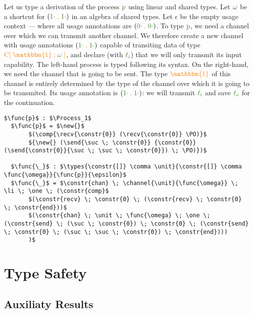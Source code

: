 \documentclass[a4paper,UKenglish,cleveref,autoref,thm-restate,authorcolumns]{lipics-v2019}
\theoremstyle{definition}
\newcommand{\type}[1]{\textcolor{BlueViolet}{\operatorname{#1}}}
\newcommand{\constr}[1]{\textcolor{BurntOrange}{\operatorname{#1}}}
\newcommand{\func}[1]{\textcolor{OliveGreen}{\operatorname{#1}}}
\newcommand{\PO}{\constr{\mathbb{0}}}
\newcommand{\comp}[2]{#1 \; \constr{\parallel} \; #2}
\newcommand{\new}{\constr{\boldsymbol{\nu}} \;}
\newcommand{\send}[2]{#1 \; \constr{\langle} \; #2 \;\constr{\rangle} \;}
\newcommand{\recv}[1]{#1 \; \constr{\mathbb{()}} \;}
\newcommand{\suc}{\constr{\scriptstyle 1+}}
\newcommand{\unit}{\constr{\mathbbm{1}}}
\newcommand{\channel}[2]{\constr{C[} \; #1 \; \constr{;} \; #2 \; \constr{]}}
\newcommand{\comma}{\; \constr{,} \;}
\newcommand{\zero}{\func{0\cdot}}
\newcommand{\one}{\func{1\cdot}}
\newcommand{\li}{\func{\ell_i}}
\newcommand{\lo}{\func{\ell_o}}
\newcommand{\types}[4]{#1 \; \type{;} \; #2 \; \type{\vdash} \; #3 \; \type{\triangleright} \; #4}
\newcommand{\Process}{\type{PROCESS}}
\begin{document}
\begin{example}
  \label{example-derivations}
  Let us type a derivation of the process $\func{p}$ using linear and shared types. 
  Let $\func{\omega}$ be a shortcut for $(\one \comma \one)$ in an algebra of shared types.
  Let $\epsilon$ be the empty usage context --- where all usage annotations are $(\zero \comma \zero)$.
  To type $\func{p}$, we need a channel over which we can transmit another channel.
  We therefore create a new channel with usage annotations $(\one \comma \one)$ capable of transiting data of type $\channel{\unit}{\func{\omega}}$, and declare (with $\li$) that we will only transmit its input capability.
  The left-hand process is typed following its syntax.
  On the right-hand, we need the channel that is going to be sent.
  The type $\unit$ of this channel is entirely determined by the type of the channel over which it is going to be transmited.
  Its usage annotation is $(\one \comma \one)$: we will transmit $\li$ and save $\lo$ for the continuation.
  
  \begin{lstlisting}[mathescape]
  $\func{p}$ : $\Process_1$
  $\func{p}$ = $\new{}$
       $(\comp{\recv{\constr{0}} (\recv{\constr{0}} \PO)}$
       ${\new{} (\send{\suc \; \constr{0}} {\constr{0}} (\send{\constr{0}}{\suc \; \suc \; \constr{0}}) \; \PO)})$

  $\func{\_}$ : $\types{\constr{[]} \comma \unit}{\constr{[]} \comma \func{\omega}}{\func{p}}{\epsilon}$
  $\func{\_}$ = $\constr{chan} \; \channel{\unit}{\func{\omega}} \; \li \; \one \; (\constr{comp}$
       $(\constr{recv} \; \constr{0} \; (\constr{recv} \; \constr{0} \; \constr{end}))$
       $(\constr{chan} \; \unit \; \func{\omega} \; \one \; (\constr{send} \; (\suc \; \constr{0}) \; \constr{0} \; (\constr{send} \; \constr{0} \; (\suc \; \suc \; \constr{0}) \; \constr{end})))
       )$
  \end{lstlisting}
\end{example}


\section{Type Safety}
\label{type-safety}


\subsection{Auxiliaty Results}
\label{auxiliary-results}
\end{document}
